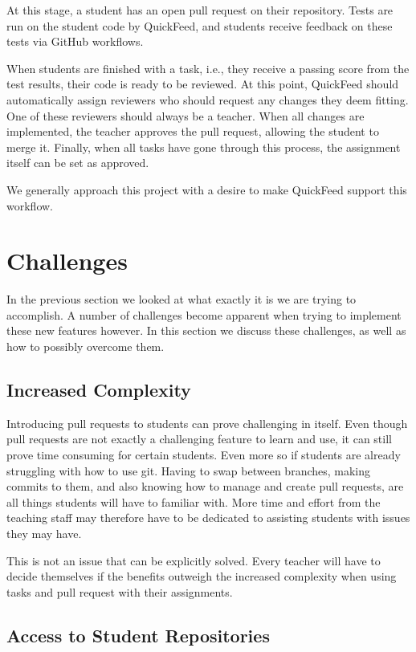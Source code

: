 At this stage, a student has an open pull request on their repository.
Tests are run on the student code by QuickFeed, and students receive feedback on these tests via GitHub workflows.

When students are finished with a task, i.e., they receive a passing score from the test results, their code is ready to be reviewed.
At this point, QuickFeed should automatically assign reviewers who should request any changes they deem fitting.
One of these reviewers should always be a teacher.
When all changes are implemented, the teacher approves the pull request, allowing the student to merge it.
Finally, when all tasks have gone through this process, the assignment itself can be set as approved.

We generally approach this project with a desire to make QuickFeed support this workflow.

\section{Challenges}

In the previous section we looked at what exactly it is we are trying to accomplish. 
A number of challenges become apparent when trying to implement these new features however.
In this section we discuss these challenges, as well as how to possibly overcome them.

\subsection{Increased Complexity}

Introducing pull requests to students can prove challenging in itself.
Even though pull requests are not exactly a challenging feature to learn and use, it can still prove time consuming for certain students.
Even more so if students are already struggling with how to use git.
Having to swap between branches, making commits to them, and also knowing how to manage and create pull requests, are all things students will have to familiar with.
More time and effort from the teaching staff may therefore have to be dedicated to assisting students with issues they may have.

This is not an issue that can be explicitly solved.
Every teacher will have to decide themselves if the benefits outweigh the increased complexity when using tasks and pull request with their assignments.

\subsection{Access to Student Repositories}

